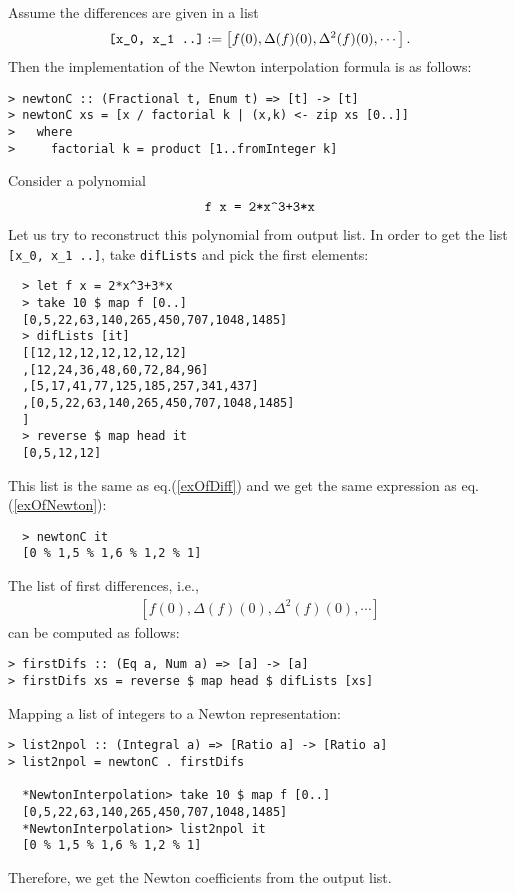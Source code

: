\documentclass[11pt]{book}
\begin{document}
Assume the differences are given in a list
\begin{eqnarray}
\verb|[x_0, x_1 ..]| := \left[f(0), \Delta(f)(0), \Delta^2(f)(0), \cdots \right].
\end{eqnarray}
Then the implementation of the Newton interpolation formula is as follows:
\begin{verbatim}
> newtonC :: (Fractional t, Enum t) => [t] -> [t]
> newtonC xs = [x / factorial k | (x,k) <- zip xs [0..]]
>   where
>     factorial k = product [1..fromInteger k]
\end{verbatim}
Consider a polynomial
\begin{eqnarray}
\verb|f x = 2*x^3+3*x|
\end{eqnarray}
Let us try to reconstruct this polynomial from output list.
In order to get the list \verb+[x_0, x_1 ..]+, take \texttt{difLists} and pick the first elements:
\begin{verbatim}
  > let f x = 2*x^3+3*x
  > take 10 $ map f [0..]
  [0,5,22,63,140,265,450,707,1048,1485]
  > difLists [it]
  [[12,12,12,12,12,12,12]
  ,[12,24,36,48,60,72,84,96]
  ,[5,17,41,77,125,185,257,341,437]
  ,[0,5,22,63,140,265,450,707,1048,1485]
  ]
  > reverse $ map head it
  [0,5,12,12]
\end{verbatim}
This list is the same as eq.(\ref{exOfDiff}) and we get the same expression as eq.(\ref{exOfNewton}):
\begin{verbatim}  
  > newtonC it
  [0 % 1,5 % 1,6 % 1,2 % 1]
\end{verbatim}

The list of first differences, i.e.,
\begin{eqnarray}
\left[ f(0), \Delta(f)(0), \Delta^2(f)(0), \cdots \right]
\end{eqnarray}
can be computed as follows:
\begin{verbatim}
> firstDifs :: (Eq a, Num a) => [a] -> [a]
> firstDifs xs = reverse $ map head $ difLists [xs]
\end{verbatim}
Mapping a list of integers to a Newton representation:
\begin{verbatim}
> list2npol :: (Integral a) => [Ratio a] -> [Ratio a]
> list2npol = newtonC . firstDifs

  *NewtonInterpolation> take 10 $ map f [0..]
  [0,5,22,63,140,265,450,707,1048,1485]
  *NewtonInterpolation> list2npol it
  [0 % 1,5 % 1,6 % 1,2 % 1]
\end{verbatim}
Therefore, we get the Newton coefficients from the output list.
\end{document}
